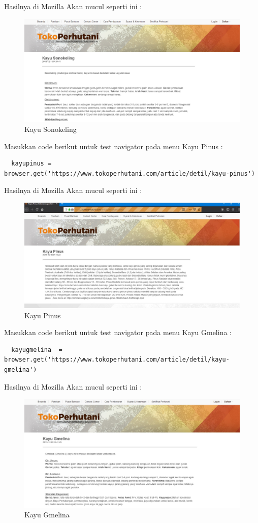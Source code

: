 Hasilnya  di Mozilla Akan mucul seperti ini :
\begin{figure}[h]
\centering
\includegraphics[scale=0.3]{figures/cc}
\caption{Kayu Sonokeling}
\end{figure}

Masukkan code berikut untuk test navigator pada menu Kayu Pinus :
\begin{verbatim}
  kayupinus = browser.get('https://www.tokoperhutani.com/article/detil/kayu-pinus')
\end{verbatim}

Hasilnya  di Mozilla Akan mucul seperti ini :
\begin{figure}[h]
\centering
\includegraphics[scale=0.3]{figures/j1}
\caption{Kayu Pinus}
\end{figure}

Masukkan code berikut untuk test navigator pada menu Kayu Gmelina :
\begin{verbatim}
  kayugmelina  = browser.get('https://www.tokoperhutani.com/article/detil/kayu-gmelina')
\end{verbatim}

Hasilnya  di Mozilla Akan mucul seperti ini :
\begin{figure}[h]
\centering
\includegraphics[scale=0.3]{figures/j2}
\caption{Kayu Gmelina}
\end{figure}

